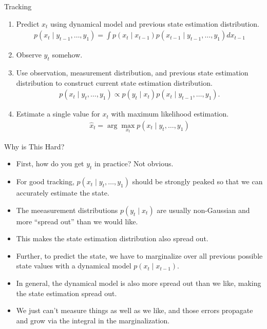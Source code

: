 \documentclass{beamer}
\begin{document}
\begin{frame}{Tracking}
 \begin{enumerate}
  \item Predict $x_t$ using dynamical model and previous state estimation distribution.
  \begin{align}
   p(x_t \mid y_{t-1},\dotsc,y_1) = \int p(x_t \mid x_{t-1}) p(x_{t-1} \mid y_{t-1},\dotsc,y_1) dx_{t-1} \nonumber
  \end{align}
  \item Observe $y_t$ somehow.
  \item Use observation, measurement distribution, and previous state
        estimation distribution to construct current state estimation distribution.
  \begin{align}
   p(x_t \mid y_t,\dotsc,y_1) \propto p(y_t \mid x_t) p(x_t \mid y_{t-1},\dotsc,y_1).
  \end{align}
  \item Estimate a single value for $x_t$ with maximum likelihood estimation.
  \begin{align}
   \hat{x}_t = \arg\max_{x_t} p(x_t \mid y_t,\dotsc,y_1) \nonumber
  \end{align}
 \end{enumerate}
\end{frame}

\begin{frame}{Why is This Hard?}
 \begin{itemize}
  \item First, how do you get $y_t$ in practice? Not obvious.
  \item For good tracking, $p(x_t \mid y_t,\dotsc,y_1)$ should be strongly peaked
        so that we can accurately estimate the state.
  \item The meeasurement distributions
        $p(y_t \mid x_t)$ are usually non-Gaussian and more ``spread out'' than we
        would like.
  \item This makes the state estimation distribution also spread out.
  \item Further, to predict the state, we have to marginalize over all previous
        possible state values with a dynamical model $p(x_t \mid x_{t-1})$.
  \item In general, the dynamical model is also more spread out than we like,
        making the state estimation spread out.
  \item We just can't measure things as well as we like, and those errors
        propagate and grow via the integral in the marginalization.
 \end{itemize}
\end{frame}
\end{document}
